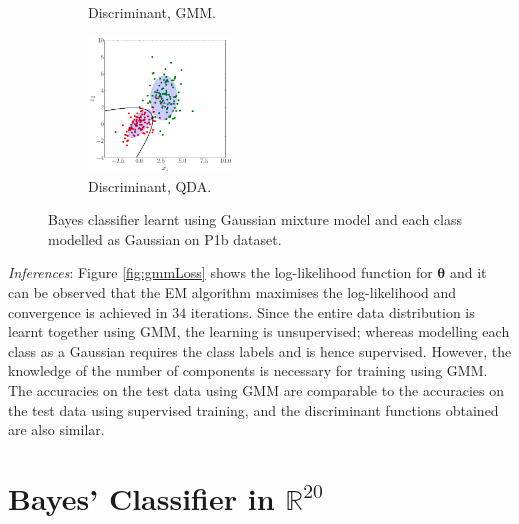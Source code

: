 \documentclass[11pt, a4 paper]{article}
\newcommand{\rr}{\mathbb{R}}
\newcommand{\btheta}{\boldsymbol{\theta}}
\begin{document}
\begin{figure}[!htbp]
\begin{subfigure}[!htbp]{0.24\textwidth}
       \caption{Discriminant, GMM.}
       \label{fig:GMM_DF_P1b}
    \end{subfigure}
\quad
    \begin{subfigure}[!htbp]{0.24\textwidth}
       \centering
       \includegraphics[width=1.5in]{../results/ex1/samples_QD_ML_dataset_P1b_size_199.pdf}
       \caption{Discriminant, QDA.}
       \label{fig:QDA_DF_P1b}
    \end{subfigure}

\caption{Bayes classifier learnt using Gaussian mixture model and each class modelled as Gaussian on P1b dataset.}
\label{fig:ex12P1b}
\end{figure}
{\it Inferences}: Figure \ref{fig:gmmLoss} shows the log-likelihood function for $\btheta$ and it can be observed that the EM algorithm maximises the log-likelihood and convergence is achieved in $34$ iterations. Since the entire data distribution is learnt together using GMM, the learning is unsupervised; whereas modelling each class as a Gaussian requires the class labels and is hence supervised. However, the knowledge of the number of components is necessary for training using GMM. The accuracies on the test data using GMM are comparable to the accuracies on the test data using supervised training, and the discriminant functions obtained are also similar.


\label{prob:1.3}



\section{Bayes' Classifier in $\rr^{20}$}
\label{sec:bayes20D}
\end{document}
